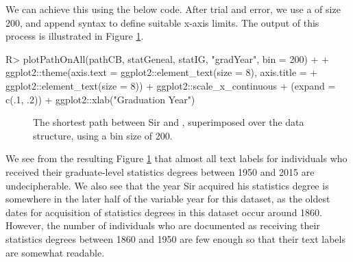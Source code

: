 \documentclass[article,shortnames]{jss}
\begin{document}
We can achieve this using the below code. After trial and error, we use a  of size 200, and append  syntax to define suitable x-axis limits. The output of this process is illustrated in Figure \ref{fig:plotCBText}.

\begin{CodeChunk}
\begin{CodeInput}
R> plotPathOnAll(pathCB, statGeneal, statIG, "gradYear", bin = 200) +
+    ggplot2::theme(axis.text = ggplot2::element_text(size = 8), axis.title =
+    ggplot2::element_text(size = 8)) + ggplot2::scale_x_continuous
+    (expand = c(.1, .2)) + ggplot2::xlab("Graduation Year")
\end{CodeInput}
\end{CodeChunk}

\begin{figure}[H]
    \centering
    \caption{The shortest path between Sir  and , superimposed over the data structure, using a bin size of 200.}
    \label{fig:plotCBText}
\end{figure}

We see from the resulting Figure \ref{fig:plotCBText} that almost all text labels for individuals who received their graduate-level statistics degrees between 1950 and 2015 are undecipherable. We also see that the year Sir  acquired his statistics degree is somewhere in the later half of the variable year for this dataset, as the oldest dates for acquisition of statistics degrees in this dataset occur around 1860. However, the number of individuals who are documented as receiving their statistics degrees between 1860 and 1950 are few enough so that their text labels are somewhat readable.
\end{document}
